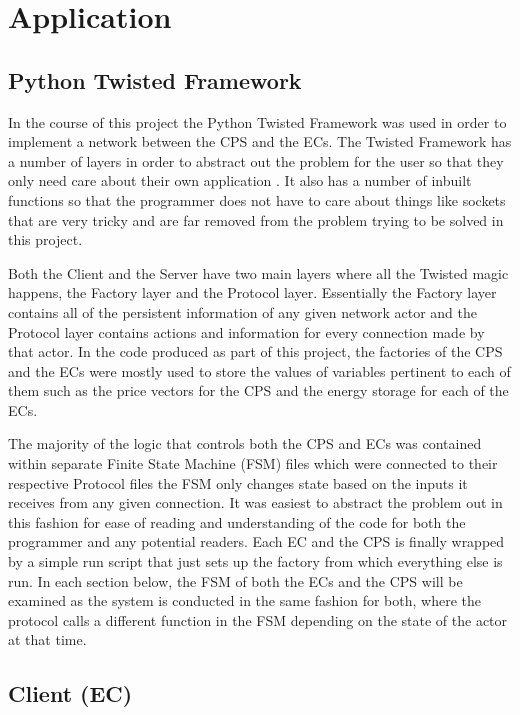 \documentclass[a4paper, notitlepage]{report}
\begin{document}
\chapter{Application}
\label{sec:org02f3493}
\section{Python Twisted Framework}
\label{sec:org2a3080b}
In the course of this project the Python Twisted Framework \cite{twistedpython}
was used in order to implement a network between the CPS and the ECs. The
Twisted Framework has a number of layers in order to abstract out the problem
for the user so that they only need care about their own application
\cite{kinder2005event}. It also has a number of inbuilt functions so that the
programmer does not have to care about things like sockets that are very tricky
and are far removed from the problem trying to be solved in this project.

Both the Client and the Server have two main layers where all the Twisted magic
happens, the Factory layer and the Protocol layer. Essentially the Factory layer
contains all of the persistent information of any given network actor and the
Protocol layer contains actions and information for every connection made by
that actor. In the code produced as part of this project, the factories of the
CPS and the ECs were mostly used to store the values of variables pertinent to
each of them such as the price vectors for the CPS and the energy storage for
each of the ECs.

The majority of the logic that controls both the CPS and ECs was contained
within separate Finite State Machine (FSM) files which were connected to their
respective Protocol files the FSM only changes state based on the inputs it
receives from any given connection. It was easiest to abstract the problem out
in this fashion for ease of reading and understanding of the code for both the
programmer and any potential readers. Each EC and the CPS is finally wrapped by
a simple run script that just sets up the factory from which everything else is
run. In each section below, the FSM of both the ECs and the CPS will be examined
as the system is conducted in the same fashion for both, where the protocol
calls a different function in the FSM depending on the state of the actor at
that time.
\section{Client (EC)}
\label{sec:orgca51663}
\end{document}
